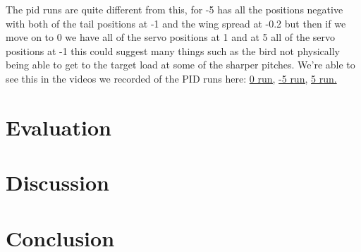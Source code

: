     The pid runs are quite different from this, for -5\textdegree{} has all the
    positions negative with both of the tail positions at -1 and the wing spread
    at -0.2 but then if we move on to 0\textdegree{} we have all of the servo
    positions at 1 and at 5\textdegree{} all of the servo positions at -1 this
    could suggest many things such as the bird not physically being able to get
    to the target load at some of the sharper pitches.
    We're able to see this in the videos we recorded of the PID runs here:
    \href{https://rmiteduau.sharepoint.com/sites/Course_cosc2781-9f144ht2HHKtf/_layouts/15/stream.aspx?id=%2Fsites%2FCourse%5Fcosc2781%2D9f144ht2HHKtf%2FShared%20Documents%2F03c%20%2D%20Project%20%20%F0%9F%93%8B%2F02%2Dbioinspired%2Ffinal%5FPID%5F0%2Emp4&referrer=StreamWebApp%2EWeb&referrerScenario=AddressBarCopied%2Eview%2Ef3885318%2D9f91%2D46c8%2Da3eb%2Dd8f4c9c4119c}{0\textdegree{} run,}
    \href{https://rmiteduau.sharepoint.com/sites/Course_cosc2781-9f144ht2HHKtf/_layouts/15/stream.aspx?id=%2Fsites%2FCourse%5Fcosc2781%2D9f144ht2HHKtf%2FShared%20Documents%2F03c%20%2D%20Project%20%20%F0%9F%93%8B%2F02%2Dbioinspired%2Ffinal%5FPID%5Fneg5%2Emp4&referrer=StreamWebApp%2EWeb&referrerScenario=AddressBarCopied%2Eview%2Ebc526bc6%2Dddeb%2D4541%2D8a43%2Dfa71c96490f9}{-5\textdegree{} run,}
    \href{https://rmiteduau.sharepoint.com/sites/Course_cosc2781-9f144ht2HHKtf/_layouts/15/stream.aspx?id=%2Fsites%2FCourse%5Fcosc2781%2D9f144ht2HHKtf%2FShared%20Documents%2F03c%20%2D%20Project%20%20%F0%9F%93%8B%2F02%2Dbioinspired%2Ffinal%5FPID%5Fpos5%2Emp4&referrer=StreamWebApp%2EWeb&referrerScenario=AddressBarCopied%2Eview%2Eb6048472%2D1336%2D4fed%2Da601%2Da2fd975ce156}{5\textdegree{} run.}

\section{Evaluation}
\section{Discussion}
\section{Conclusion}
